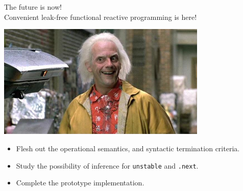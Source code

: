 \documentclass{beamer}
\newcommand{\goal}{\mathbin{>}}
\renewcommand{\synth}{\mathbin{\searrow}}
\newcommand{\code}[1]{\;\text{\texttt{#1}}\;}
\renewcommand{\circle}{\bigcirc}
\begin{document}
\begin{frame}
  \centering
  \alert{\Huge The future is now!} \\
  Convenient leak-free functional reactive programming is here!

  \includegraphics[width=0.75\textwidth]{doc-brown-happy.jpg}

  \pause 
  \begin{itemize}
    \item
      Flesh out the operational semantics, and syntactic termination criteria.

    \item
      Study the possibility of inference for \texttt{unstable} and
      \texttt{.next}.

    \item
      Complete the prototype implementation.
  \end{itemize}
\end{frame}


\end{document}
